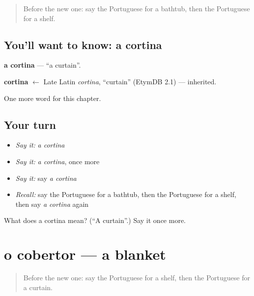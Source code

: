 \label{lesson:PT-C94-cortina}



\begin{quote}
Before the new one: say the Portuguese for a bathtub, then the Portuguese for a shelf.
\end{quote}

\subsection*{You'll want to know: a cortina}
\textbf{a cortina} — \textquotedblleft{}a curtain\textquotedblright{}.

\begin{cousinweb}
\textbf{cortina} $\leftarrow$ Late Latin \emph{cortina}, \textquotedblleft{}curtain\textquotedblright{} (EtymDB 2.1) — inherited.
\end{cousinweb}

\begin{grammarlens}[title={What you've built}]
One more word for this chapter.
\end{grammarlens}

\subsection*{Your turn}
\begin{itemize}
\raggedright
  \item \emph{Say it:} \emph{a cortina}
  \item \emph{Say it:} \emph{a cortina}, once more
  \item \emph{Say it:} say \emph{a cortina}
  \item \emph{Recall:} say the Portuguese for a bathtub, then the Portuguese for a shelf, then say \emph{a cortina} again
\end{itemize}

\begin{tcolorbox}[breakable,colback=teal!4,colframe=teal!35!black,title={Before you move on}]
What does a cortina mean? (\textquotedblleft{}A curtain\textquotedblright{}.) Say it once more.
\end{tcolorbox}
\section[o cobertor]{o cobertor — a blanket}

\label{lesson:PT-C94-cobertor}



\begin{quote}
Before the new one: say the Portuguese for a shelf, then the Portuguese for a curtain.
\end{quote}

